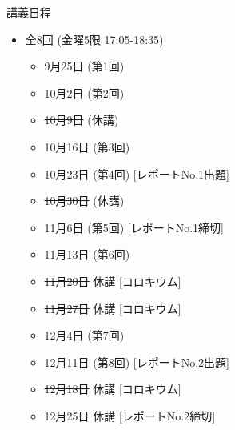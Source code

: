 \begin{frame}[t]{講義日程}
  \begin{itemize}
  \item 全8回 (金曜5限 {\color{red}17:05}-18:35)
    \begin{itemize}
    \item 9月25日 (第1回)
    \item 10月2日 (第2回)
    \item {\color{gray}\sout{10月9日} (休講)}
    \item 10月16日 (第3回)
    \item 10月23日 (第4回) [レポートNo.1出題]
    \item {\color{gray}\sout{10月30日} (休講)}
    \item 11月6日 (第5回) [レポートNo.1締切]
    \item 11月13日 (第6回)
    \item {\color{gray}\sout{11月20日} 休講} [コロキウム]
    \item {\color{gray}\sout{11月27日} 休講} [コロキウム]
    \item 12月4日 (第7回)
    \item 12月11日 (第8回) [レポートNo.2出題]
    \item {\color{gray}\sout{12月18日} 休講} [コロキウム]
    \item {\color{gray}\sout{12月25日} 休講} [レポートNo.2締切]
     \end{itemize}
  \end{itemize}
\end{frame}
